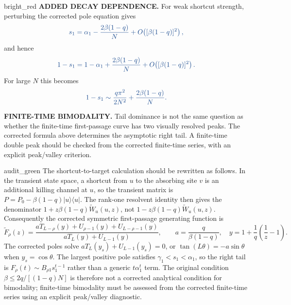 \documentclass[10pt, hidelinks, superscriptaddress, amsmath, amssymb, aps, pre]{revtex4-2}
\newcommand{\auditlabel}[1]{\textbf{\textcolor{audit_blue}{#1}}}
\newcommand{\auditcorrected}[1]{\textcolor{audit_blue}{#1}}
\begin{document}
\begin{auditbox}{bright_red}
\auditlabel{ADDED DECAY DEPENDENCE.}  For weak shortcut strength, perturbing
the corrected pole equation gives
\begin{align}
\auditcorrected{
s_1=\alpha_1-\frac{2\beta(1-q)}{N}
 +O\!\left([\beta(1-q)]^2\right),}
\label{eq:audit_corrected_s1_weak}
\end{align}
and hence
\begin{align}
\auditcorrected{
1-s_1=1-\alpha_1+\frac{2\beta(1-q)}{N}
 +O\!\left([\beta(1-q)]^2\right).}
\label{eq:audit_corrected_gap_weak}
\end{align}
For large $N$ this becomes
\begin{align}
\auditcorrected{
1-s_1\sim \frac{q\pi^2}{2N^2}+\frac{2\beta(1-q)}{N}.}
\label{eq:audit_corrected_gap_largeN}
\end{align}

\auditlabel{FINITE-TIME BIMODALITY.}  Tail dominance is not the same question
as whether the finite-time first-passage curve has two visually resolved
peaks.  The corrected formula above determines the asymptotic right tail.  A
finite-time double peak should be checked from the corrected finite-time
series, with an explicit peak/valley criterion.
\end{auditbox}

\begin{auditbox}{audit_green}
The shortcut-to-target calculation should be rewritten as follows.  In the
transient state space, a shortcut from $u$ to the absorbing site $v$ is an
additional killing channel at $u$, so the transient matrix is
$P=P_0-\beta(1-q)|u\rangle\langle u|$.  The rank-one resolvent identity then
gives the denominator $1+z\beta(1-q)\widetilde W_u(u,z)$, not
$1-z\beta(1-q)\widetilde W_u(u,z)$.  Consequently the corrected symmetric
first-passage generating function is
\[
\widetilde F_\rho(z)=
\frac{aT_{L-\rho}(y)+U_{\rho-1}(y)+U_{L-\rho-1}(y)}
{aT_L(y)+U_{L-1}(y)},\qquad
a=\frac{q}{\beta(1-q)},\quad
y=1+\frac1q\left(\frac1z-1\right).
\]
The corrected poles solve $aT_L(y_s)+U_{L-1}(y_s)=0$, or
$\tan(L\theta)=-a\sin\theta$ when $y_s=\cos\theta$.  The largest positive pole
satisfies $\gamma_1<s_1<\alpha_1$, so the right tail is
$F_\rho(t)\sim B_{\rho1}s_1^{t-1}$ rather than a generic $t\alpha_1^t$ term.
The original condition $\beta\leq 2q/[(1-q)N]$ is therefore not a corrected
analytical condition for bimodality; finite-time bimodality must be assessed
from the corrected finite-time series using an explicit peak/valley diagnostic.
\end{auditbox}


\fi
\end{document}

